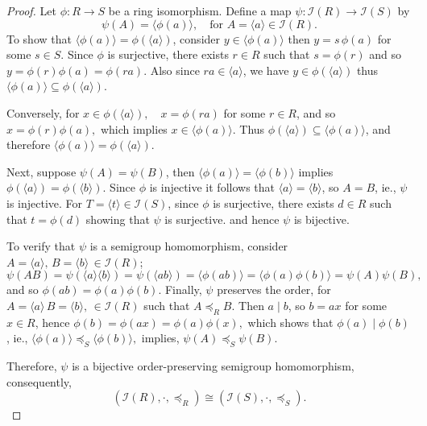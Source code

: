 \documentclass[12pt,a4paper]{amsart}
\theoremstyle{plain}
\theoremstyle{definition}
\begin{document}
\begin{proof}
	Let $\phi \colon R \to S$ be a ring isomorphism. Define a map 
	$\psi \colon \mathcal{I}(R) \to \mathcal{I}(S)$ by
	\[
	\psi(A) = \langle \phi(a) \rangle , \quad \text{for } A = \langle a \rangle \in \mathcal{I}(R).
	\]
	To show that $\langle \phi(a) \rangle = \phi(\langle a \rangle)$, consider 
	$y \in \langle \phi(a) \rangle$  then $y = s\,\phi(a)$ for some $s \in S$. 
	Since $\phi$ is surjective, there exists $r \in R$ such that $s = \phi(r)$ and so 
	$y = \phi(r)\phi(a) = \phi(ra).$ Also since $ra \in \langle a \rangle$, we have $y \in \phi(\langle a \rangle)$  thus $\langle \phi(a) \rangle \subseteq \phi(\langle a \rangle)$.
	
	Conversely, for $x \in \phi(\langle a \rangle),\quad x = \phi(ra)$ for some $r \in R$, and so $	x = \phi(r)\phi(a),$
	which implies $x \in \langle \phi(a) \rangle$. Thus 
	$\phi(\langle a \rangle) \subseteq \langle \phi(a) \rangle$, and therefore
$	\langle \phi(a) \rangle = \phi(\langle a \rangle).$
	
	Next, suppose $\psi(A) = \psi(B)$, then
$	\langle \phi(a) \rangle = \langle \phi(b) \rangle$
	implies $\phi(\langle a \rangle) = \phi(\langle b \rangle)$. 
	Since $\phi$ is injective it follows that $\langle a \rangle = \langle b \rangle$, 
	so $A = B$, ie., $\psi$ is injective. For $T = \langle t \rangle \in \mathcal{I}(S)$, 
	since $\phi$ is surjective, there exists $d \in R$ such that $t = \phi(d)$
	showing that $\psi$ is surjective. and hence $\psi$ is bijective.
	
	To verify that $\psi$ is a semigroup homomorphism, consider $A = \langle a \rangle,\, B = \langle b \rangle\, \in \mathcal{I}(R)$; 
	\[
	\psi(AB)
	= \psi(\langle a \rangle \langle b \rangle)
	= \psi(\langle ab \rangle)
	= \langle \phi(ab) \rangle
	= \langle \phi(a)\phi(b) \rangle
	= \psi(A)\psi(B),
	\]
	and so $\phi(ab) = \phi(a)\phi(b)$.
	Finally, $\psi$ preserves the order, for $A = \langle a \rangle\, B = \langle b \rangle,\, \in \mathcal{I}(R)$ such that 
	$A \preccurlyeq_R B$. Then $a \mid b$, so $b = ax$ for some $x \in R$, hence $\phi(b) = \phi(ax) = \phi(a)\phi(x),$
	which shows that $\phi(a) \mid \phi(b)$, ie., $	\langle \phi(a) \rangle \preccurlyeq_S \langle \phi(b) \rangle,$ implies, $\psi(A) \preccurlyeq_S \psi(B).$
	
	Therefore, $\psi$ is a bijective order-preserving semigroup homomorphism, consequently,
	\[
	(\mathcal{I}(R), \cdot, \preccurlyeq_R)
	\cong
	(\mathcal{I}(S), \cdot, \preccurlyeq_S).
	\]
\end{proof}
\end{document}
